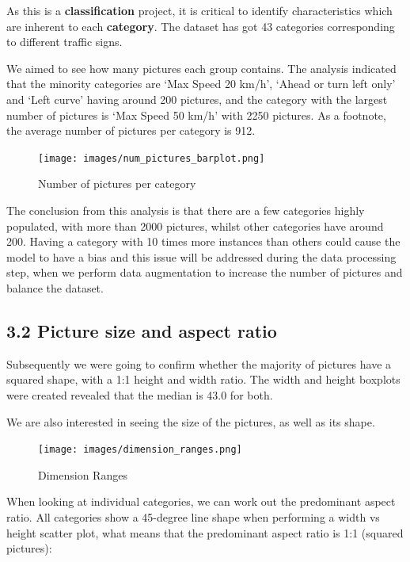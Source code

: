 \documentclass[
  11pt,
]{article}
\begin{document}
As this is a \textbf{classification} project, it is critical to identify
characteristics which are inherent to each \textbf{category}. The
dataset has got 43 categories corresponding to different traffic signs.

We aimed to see how many pictures each group contains. The analysis
indicated that the minority categories are `Max Speed 20 km/h', `Ahead
or turn left only' and `Left curve' having around 200 pictures, and the
category with the largest number of pictures is `Max Speed 50 km/h' with
2250 pictures. As a footnote, the average number of pictures per
category is 912.

\begin{figure}
\centering
\texttt{[image: images/num\_pictures\_barplot.png]}
\caption{Number of pictures per category}
\end{figure}

The conclusion from this analysis is that there are a few categories
highly populated, with more than 2000 pictures, whilst other categories
have around 200. Having a category with 10 times more instances than
others could cause the model to have a bias and this issue will be
addressed during the data processing step, when we perform data
augmentation to increase the number of pictures and balance the dataset.

\hypertarget{picture-size-and-aspect-ratio}{%
\subsection{3.2 Picture size and aspect
ratio}\label{picture-size-and-aspect-ratio}}

Subsequently we were going to confirm whether the majority of pictures
have a squared shape, with a 1:1 height and width ratio. The width and
height boxplots were created revealed that the median is 43.0 for both.

We are also interested in seeing the size of the pictures, as well as
its shape.

\begin{figure}
\centering
\texttt{[image: images/dimension\_ranges.png]}
\caption{Dimension Ranges}
\end{figure}

When looking at individual categories, we can work out the predominant
aspect ratio. All categories show a 45-degree line shape when performing
a width vs height scatter plot, what means that the predominant aspect
ratio is 1:1 (squared pictures):
\end{document}
